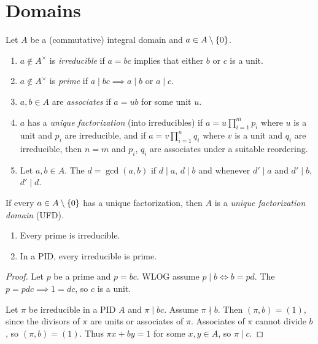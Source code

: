 \section{Domains} \label{sec:domains}
\begin{definition*}
    Let $A$ be a (commutative) integral domain and
    $a \in A \setminus \{0\}$.
    \begin{enumerate}
        \item $a \notin A^\times$ is \emph{irreducible} if $a = bc$ implies
        that either $b$ or $c$ is a unit.
        \item $a \notin A^\times$ is \emph{prime} if
        $a \mid bc \implies a \mid b$ or $a \mid c$.
        \item $a, b \in A$ are \emph{associates} if $a = ub$ for some unit
        $u$.
        \item $a$ has a \emph{unique factorization} (into irreducibles) if
        $a = u \prod_{i=1}^m p_i$ where $u$ is a unit and $p_i$ are
        irreducible,
        and if $a = v \prod_{i=1}^n q_i$ where $v$ is a unit and $q_i$ are
        irreducible, then $n = m$ and $p_i$, $q_i$ are associates under
        a suitable reordering.
        \item Let $a, b \in A$.
        The $d = \gcd(a, b)$ if $d \mid a$, $d \mid b$ and whenever
        $d' \mid a$ and $d' \mid b$, $d' \mid d$.
    \end{enumerate}
    If every $a \in A \setminus \{0\}$ has a unique factorization, then
    $A$ is a \emph{unique factorization domain} (UFD).
\end{definition*}

\begin{proposition}
    \begin{enumerate}
        \item Every prime is irreducible.
        \item In a PID, every irreducible is prime.
    \end{enumerate}
\end{proposition}
\begin{proof}
    Let $p$ be a prime and $p = bc$.
    WLOG assume $p \mid b \iff b = pd$.
    The $p = pdc \implies 1 = dc$, so $c$ is a unit.

    Let $\pi$ be irreducible in a PID $A$ and $\pi \mid bc$.
    Assume $\pi \nmid b$.
    Then $(\pi, b) = (1)$, since the divisors of $\pi$ are units or
    associates of $\pi$.
    Associates of $\pi$ cannot divide $b$, so $(\pi, b) = (1)$.
    Thus $\pi x + b y = 1$ for some $x, y \in A$, so $\pi \mid c$.
\end{proof}

